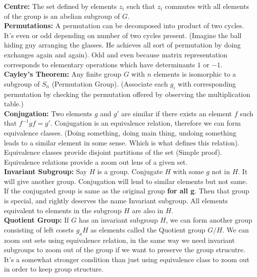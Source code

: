 \documentclass{report}
\begin{document}
\noindent\textbf{Centre:} The set defined by elements $z_i$ such that $z_i$ commutes with all elements of the group is an abelian subgroup of $G$.\\

\noindent\textbf{Permutations:} A permutation can be decomposed into product of two cycles. It's even or odd depending on number of two cycles present. (Imagine the ball hiding guy arranging the glasses. He achieves all sort of permutation by doing exchanges again and again). Odd and even because matrix representation corresponds to elementary operations which have determinants $1$ or $-1$.\\

\noindent\textbf{Cayley's Theorem:} Any finite group $G$ with $n$ elements is isomorphic to a subgroup of $S_n$ (Permutation Group). (Associate each $g_i$ with corresponding permutation by checking the permutation offered by observing the multiplication table.)\\

\noindent\textbf{Conjugation:} Two elements $g$ and $g'$ are similar if there exists an element $f$ such that $f^{-1}gf = g'$. Conjugation is an equivalence relation, therefore we can form equivalence classes. (Doing something, doing main thing, undoing something leads to a similar element in some sense. Which is what defines this relation). Equivalence classes provide disjoint partitions of the set (Simple proof). Equivalence relations provide a zoom out lens of a given set.\\

\noindent\textbf{Invariant Subgroup:} Say $H$ is a group. Conjugate $H$ with some $g$ not in $H$. It will give another group. Conjugation will lend to similar elements but not same. If the conjugated group is same as the original group \textbf{for all g}. Then that group is special, and rightly deserves the name Invariant subgroup. All elements equivalent to elements in the subgroup $H$ are also in $H$.\\

\noindent\textbf{Quotient Group:} If $G$ has an invariant subgroup $H$, we can form another group consisting of left cosets $g_aH$ as elements called the Quotient group $G/H$. We can zoom out sets using equivalence relation, in the same way we need invariant subgroups to zoom out of the group if we want to preserve the group strucutre. It's a somewhat stronger condition than just using equivalence class to zoom out in order to keep group structure. \\
\end{document}
